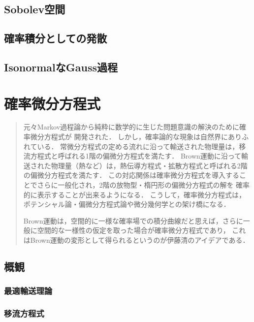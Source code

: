 \documentclass[uplatex,dvipdfmx]{jsreport}
\begin{document}
\section{Sobolev空間}

\section{確率積分としての発散}

\section{IsonormalなGauss過程}

\chapter{確率微分方程式}

\begin{quotation}
    元々Markov過程論から純粋に数学的に生じた問題意識の解決のために確率微分方程式が
    開発された．
    しかし，確率論的な現象は自然界にありふれている．
    常微分方程式の定める流れに沿って輸送された物理量は，移流方程式と呼ばれる1階の偏微分方程式を満たす．
    Brown運動に沿って輸送された物理量（熱など）は，熱伝導方程式・拡散方程式と呼ばれる2階の偏微分方程式を満たす．
    この対応関係は確率微分方程式を導入することでさらに一般化され，2階の放物型・楕円形の偏微分方程式の解を
    確率的に表示することが出来るようになる．
    こうして，確率微分方程式は，ポテンシャル論・偏微分方程式論や微分幾何学との架け橋になる．

    Brown運動は，空間的に一様な確率場での積分曲線だと思えば，さらに一般に空間的な一様性の仮定を取った場合が確率微分方程式であり，
    これはBrown運動の変形として得られるというのが伊藤清のアイデアである．
\end{quotation}

\section{概観}

\subsection{最適輸送理論}

\begin{definition}
    
\end{definition}

\subsection{移流方程式}
\end{document}
